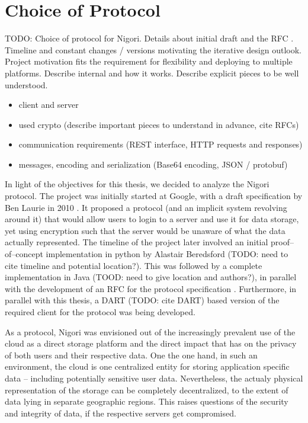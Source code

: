 \section{Choice of Protocol}
TODO: Choice of protocol for Nigori. Details about initial draft \cite{NigoriDraft} and the \wip RFC \cite{NigoriRFC}. Timeline and constant changes / versions motivating the iterative design outlook. Project motivation fits the requirement for flexibility and deploying to multiple platforms. Describe internal and how it works. Describe explicit pieces to be well understood.
\begin{itemize}
  \item client and server
  \item used crypto (describe important pieces to understand in advance, cite RFCs)
  \item communication requirements (REST interface, HTTP requests and responses)
  \item messages, encoding and serialization (Base64 encoding, JSON / protobuf)
\end{itemize}

In light of the objectives for this thesis, we decided to analyze the Nigori protocol.
The project was initially started at Google, with a draft specification by Ben Laurie in 2010 \cite{NigoriDraft}.
It proposed a protocol (and an implicit system revolving around it) that would allow users to login to a server and use it for data storage, yet using encryption such that the server would be unaware of what the data actually represented.
The timeline of the project later involved an initial proof--of--concept implementation in python by Alastair Beredsford (TODO: need to cite timeline and potential location?).
This was followed by a complete implementation in Java (TOOD: need to give location and authors?), in parallel with the development of an RFC for the protocol specification \cite{NigoriRFC}.
Furthermore, in parallel with this thesis, a DART (TODO: cite DART) based version of the required client for the protocol was being developed.

As a protocol, Nigori was envisioned out of the increasingly prevalent use of the cloud as a direct storage platform and the direct impact that has on the privacy of both users and their respective data.
One the one hand, in such an environment, the cloud is one centralized entity for storing application specific data -- including potentially sensitive user data.
Nevertheless, the actualy physical representation of the storage can be completely decentralized, to the extent of data lying in separate geographic regions.
This raises questions of the security and integrity of data, if the respective servers get compromised.


